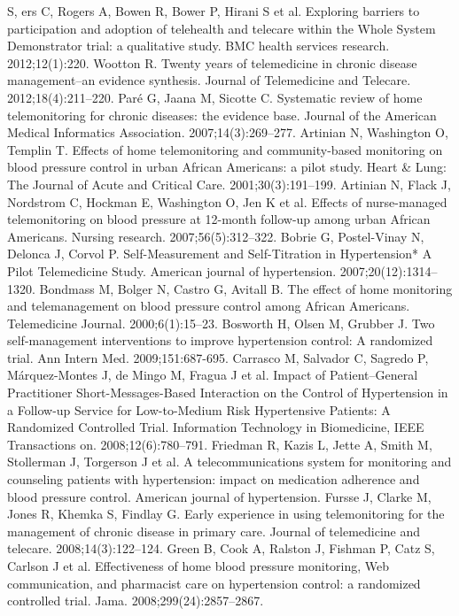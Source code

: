 \documentclass[11pt]{article}
\begin{document}
\begin{thebibliography}{40}
\begin{singlespace}
S, ers C, Rogers A, Bowen R, Bower P, Hirani S et al. Exploring barriers to participation and adoption of telehealth and telecare within the Whole System Demonstrator trial: a qualitative study. BMC health services research. 2012;12(1):220. 
Wootton R. Twenty years of telemedicine in chronic disease management--an evidence synthesis. Journal of Telemedicine and Telecare. 2012;18(4):211--220.
Par\'e G, Jaana M, Sicotte C. Systematic review of home telemonitoring for chronic diseases: the evidence base. Journal of the American Medical Informatics Association. 2007;14(3):269--277. 
Artinian N, Washington O, Templin T. Effects of home telemonitoring and community-based monitoring on blood pressure control in urban African Americans: a pilot study. Heart \& Lung: The Journal of Acute and Critical Care. 2001;30(3):191--199. 
 Artinian N, Flack J, Nordstrom C, Hockman E, Washington O, Jen K et al. Effects of nurse-managed telemonitoring on blood pressure at 12-month follow-up among urban African Americans. Nursing research. 2007;56(5):312--322. 
Bobrie G, Postel-Vinay N, Delonca J, Corvol P. Self-Measurement and Self-Titration in Hypertension* A Pilot Telemedicine Study. American journal of hypertension. 2007;20(12):1314--1320. 
Bondmass M, Bolger N, Castro G, Avitall B. The effect of home monitoring and telemanagement on blood pressure control among African Americans. Telemedicine Journal. 2000;6(1):15--23. 
Bosworth H, Olsen M, Grubber J. Two self-management interventions to improve hypertension control: A randomized trial. Ann Intern Med. 2009;151:687-695. 
Carrasco M, Salvador C, Sagredo P, M\'arquez-Montes J, de Mingo M, Fragua J et al. Impact of Patient--General Practitioner Short-Messages-Based Interaction on the Control of Hypertension in a Follow-up Service for Low-to-Medium Risk Hypertensive Patients: A Randomized Controlled Trial. Information Technology in Biomedicine, IEEE Transactions on. 2008;12(6):780--791. 
 Friedman R, Kazis L, Jette A, Smith M, Stollerman J, Torgerson J et al. A telecommunications system for monitoring and counseling patients with hypertension: impact on medication adherence and blood pressure control. American journal of hypertension.
Fursse J, Clarke M, Jones R, Khemka S, Findlay G. Early experience in using telemonitoring for the management of chronic disease in primary care. Journal of telemedicine and telecare. 2008;14(3):122--124. 
 Green B, Cook A, Ralston J, Fishman P, Catz S, Carlson J et al. Effectiveness of home blood pressure monitoring, Web communication, and pharmacist care on hypertension control: a randomized controlled trial. Jama. 2008;299(24):2857--2867. 

\end{singlespace}
\end{thebibliography}
\end{document}
